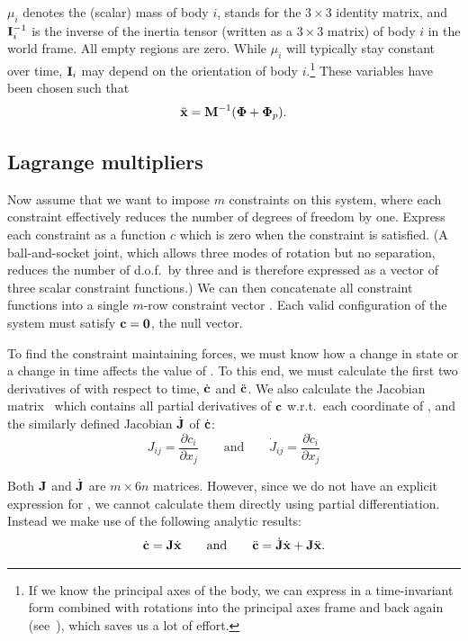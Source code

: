 $\mu_i$ denotes the (scalar) mass of body $i$,  stands for the $3\times3$
identity matrix, and $\m{I}_i^{-1}$ is the inverse of the inertia tensor (written as a
$3\times3$ matrix) of body $i$ in the world frame. All empty regions are zero. While $\mu_i$
will typically stay constant over time, $\m{I}_i$ may depend on the orientation of body
$i$.\footnote{If we know the principal axes of the body, we can express  in a time-invariant
form combined with rotations into the principal axes frame and back again
(see~\cite{BaraffWitkin:97}), which saves us a lot of effort.} These variables have been chosen
such that
\begin{equation}
\ddot{\ve{x}} = \m{M}^{-1} (\ve{\Phi} + \ve{\Phi}_p).
\end{equation}

\subsection{Lagrange multipliers}

Now assume that we want to impose $m$ constraints on this system, where each constraint
effectively reduces the number of degrees of freedom by one. Express each constraint as a function
$c$ which is zero when the constraint is satisfied. (A ball-and-socket joint, which allows three
modes of rotation but no separation, reduces the number of d.o.f.\ by three and is therefore
expressed as a vector of three scalar constraint functions.) We can then concatenate all
constraint functions into a single $m$-row constraint vector . Each valid configuration of
the system must satisfy $\ve{c} = \ve{0}$, the null vector.

To find the constraint maintaining forces, we must know how a change in state or a change in
time affects the value of . To this end, we must calculate the first two derivatives of
 with respect to time, $\dot{\ve{c}}$ and $\ddot{\ve{c}}$. We also calculate the Jacobian
matrix~\cite{RHB:02}  which contains all partial derivatives of $\ve{c}$ w.r.t.\ each
coordinate of , and the similarly defined Jacobian $\dot{\m{J}}$ of $\dot{\ve{c}}$:
\begin{equation}
J_{ij} = \frac{\partial c_i}{\partial x_j} \quad\quad\mathrm{and}\quad\quad
\dot{J}_{ij} = \frac{\partial \dot{c}_i}{\partial x_j}
\end{equation}

Both $\m{J}$ and $\dot{\m{J}}$ are $m \times 6n$ matrices. However, since we do not
have an explicit expression for , we cannot calculate them directly using
partial differentiation. Instead we make use of the following analytic results:
\begin{equation}
\label{cDotAndCDDot}
\dot{\ve{c}} = \m{J}\dot{\ve{x}} \quad\quad\mathrm{and}\quad\quad
\ddot{\ve{c}} = \dot{\m{J}}\dot{\ve{x}} + \m{J}\ddot{\ve{x}}.
\end{equation}

